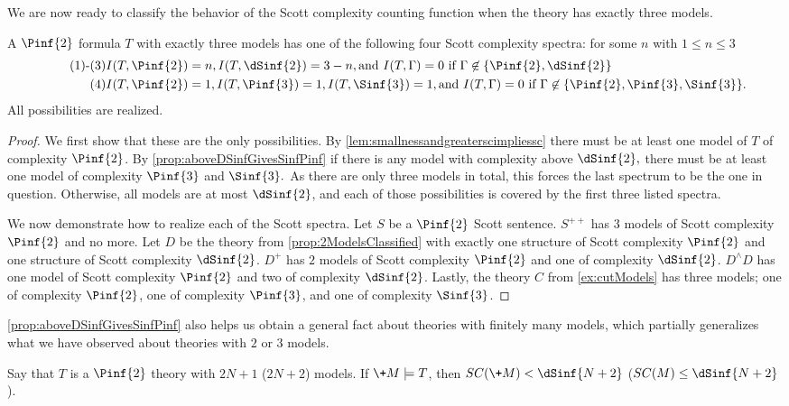 \documentclass{amsart}
\renewcommand{\-}{\text{-}}
\begin{document}
We are now ready to classify the behavior of the Scott complexity counting function when the theory has exactly three models.

\begin{proposition}
A $\Pinf{2}$ formula $T$ with exactly three models has one of the following four Scott complexity spectra:
for some $n$ with $1\leq n\leq3$
\begin{align} \tag*{(1)-(3)}&I(T,\Pinf{2})=n,  I(T,\dSinf{2})=3-n, \text{and }  I(T,\Gamma)=0 \text{ if $\Gamma\not\in \{\Pinf{2}, \dSinf{2}\}$}\\
\tag{4}&I(T,\Pinf{2})=1,  I(T,\Pinf{3})=1,  I(T,\Sinf{3})=1,\text{and }  I(T,\Gamma)=0 \text{ if $\Gamma\not\in \{ \Pinf{2},\Pinf{3},\Sinf{3}\}$.}\end{align}
All possibilities are realized.
\end{proposition}

\begin{proof}
We first show that these are the only possibilities.
By \cref{lem:smallnessandgreaterscimpliessc} there must be at least one model of $T$ of complexity $\Pinf{2}$.
By \cref{prop:aboveDSinfGivesSinfPinf} if there is any model with complexity above $\dSinf{2},$ there must be at least one model of complexity $\Pinf{3}$ and $\Sinf{3}.$
As there are only three models in total, this forces the last spectrum to be the one in question.
Otherwise, all models are at most $\dSinf{2}$, and each of those possibilities is covered by the first three listed spectra.

We now demonstrate how to realize each of the Scott spectra.
Let $S$ be a $\Pinf{2}$ Scott sentence.
$S^{++}$ has $3$ models of Scott complexity $\Pinf{2}$ and no more.
Let $D$ be the theory from \cref{prop:2ModelsClassified} with exactly one structure of Scott complexity $\Pinf{2}$ and one structure of Scott complexity $\dSinf{2}$.
$D^+$ has $2$ models of Scott complexity $\Pinf{2}$ and one of complexity $\dSinf{2}$.
$D^\wedge D$ has one model of Scott complexity $\Pinf{2}$ and two of complexity $\dSinf{2}$.
Lastly, the theory $C$ from \cref{ex:cutModels} has three models; one of complexity $\Pinf{2}$, one of complexity $\Pinf{3}$, and one of complexity $\Sinf{3}$.
\end{proof}

\cref{prop:aboveDSinfGivesSinfPinf} also helps us obtain a general fact about theories with finitely many models, which partially generalizes what we have observed about theories with $2$ or $3$ models.

\begin{proposition}\label{prop:finiteHeight}
Say that $T$ is a $\Pinf{2}$ theory with $2N+1$ ($2N+2$) models.
If $\+M\models T$, then $SC(\+M)<\dSinf{N+2}$ ($SC(M)\leq\dSinf{N+2}$).
\end{proposition}
\end{document}
